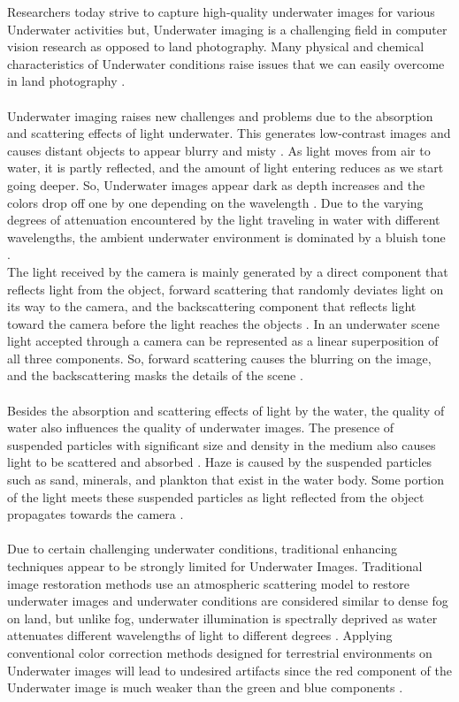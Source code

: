 \documentclass[a4paper,11pt,oneside]{article}
\begin{document}
  Researchers today strive to capture high-quality underwater images for various Underwater activities \cite{15} but, Underwater imaging is a challenging field in computer vision research as opposed to land photography. Many physical and chemical characteristics of Underwater conditions raise issues that we can easily overcome in land photography \cite{15}.\\
  \\
  Underwater imaging raises new challenges and problems due to the absorption and scattering effects of light underwater. This generates low-contrast images and causes distant objects to appear blurry and misty \cite{3}. As light moves from air to water, it is partly reflected, and the amount of light entering reduces as we start going deeper. So, Underwater images appear dark as depth increases and the colors drop off one by one depending on the wavelength \cite{4}. Due to the varying degrees of attenuation encountered by the light traveling in water with different wavelengths, the ambient underwater environment is dominated by a bluish tone \cite{20}.\\
  The light received by the camera is mainly generated by a direct component that reflects light from the object, forward scattering that randomly deviates light on its way to the camera, and the backscattering component that reflects light toward the camera before the light reaches the objects \cite{21}. In an underwater scene light accepted through a camera can be represented as a linear superposition of all three components.  So, forward scattering causes the blurring on the image, and the backscattering masks the details of the scene \cite{21}.\\
  \\
  Besides the absorption and scattering effects of light by the water, the quality of water also influences the quality of underwater images. The presence of suspended particles with significant size and density in the medium also causes light to be scattered and absorbed \cite{8}. Haze is caused by the suspended particles such as sand, minerals, and plankton that exist in the water body. Some portion of the light meets these suspended particles as light reflected from the object propagates towards the camera \cite{13}.\\
  \\
  Due to certain challenging underwater conditions, traditional enhancing techniques appear to be strongly limited for Underwater Images. Traditional image restoration methods use an atmospheric scattering model to restore underwater images\cite{11} and underwater conditions are considered similar to dense fog on land, but unlike fog, underwater illumination is spectrally deprived as water attenuates different wavelengths of light to different degrees \cite{2}. Applying conventional color correction methods designed for terrestrial environments on Underwater images will lead to undesired artifacts since the red component of the Underwater image is much weaker than the green and blue components \cite{6}.\\
\end{document}
